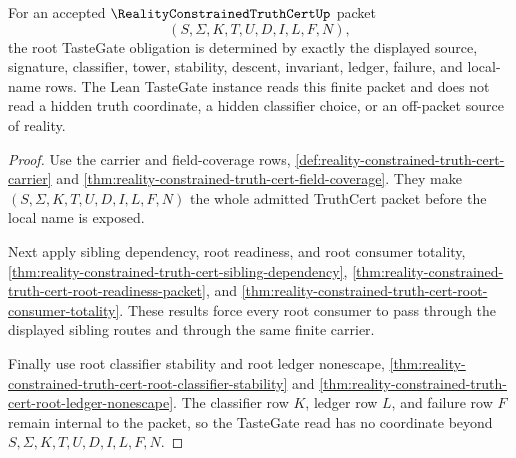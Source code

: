 \begin{theorem}
\label{thm:reality-constrained-truth-cert-root-tastegate-obligation}
For an accepted $\RealityConstrainedTruthCertUp$ packet
$$
(S,\Sigma,K,T,U,D,I,L,F,N),
$$
the root TasteGate obligation is determined by exactly the displayed source,
signature, classifier, tower, stability, descent, invariant, ledger, failure,
and local-name rows. The Lean TasteGate instance reads this finite packet and
does not read a hidden truth coordinate, a hidden classifier choice, or an
off-packet source of reality.
\end{theorem}
\begin{proof}
Use the carrier and field-coverage rows,
\autoref{def:reality-constrained-truth-cert-carrier} and
\autoref{thm:reality-constrained-truth-cert-field-coverage}. They make
$(S,\Sigma,K,T,U,D,I,L,F,N)$ the whole admitted TruthCert packet before the
local name is exposed.

Next apply sibling dependency, root readiness, and root consumer totality,
\autoref{thm:reality-constrained-truth-cert-sibling-dependency},
\autoref{thm:reality-constrained-truth-cert-root-readiness-packet}, and
\autoref{thm:reality-constrained-truth-cert-root-consumer-totality}. These
results force every root consumer to pass through the displayed sibling routes
and through the same finite carrier.

Finally use root classifier stability and root ledger nonescape,
\autoref{thm:reality-constrained-truth-cert-root-classifier-stability} and
\autoref{thm:reality-constrained-truth-cert-root-ledger-nonescape}. The
classifier row $K$, ledger row $L$, and failure row $F$ remain internal to the
packet, so the TasteGate read has no coordinate beyond
$S,\Sigma,K,T,U,D,I,L,F,N$.
\end{proof}

